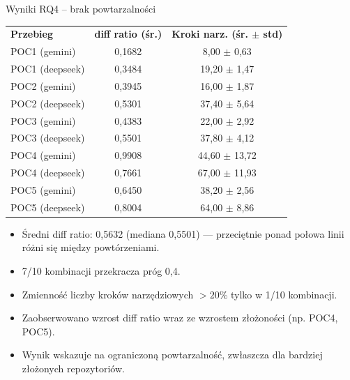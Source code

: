\documentclass[aspectratio=169]{beamer}
\begin{document}
\begin{frame}{Wyniki RQ4 -- brak powtarzalności}
    \small
    \begin{center}
        \begin{tabular}{lcc}
            \textbf{Przebieg} & \textbf{diff ratio (śr.)} & \textbf{Kroki narz. (śr. $\pm$ std)} \\
            POC1 (gemini) & 0,1682 & 8,00 $\pm$ 0,63 \\
            POC1 (deepseek) & 0,3484 & 19,20 $\pm$ 1,47 \\
            POC2 (gemini) & 0,3945 & 16,00 $\pm$ 1,87 \\
            POC2 (deepseek) & 0,5301 & 37,40 $\pm$ 5,64 \\
            POC3 (gemini) & 0,4383 & 22,00 $\pm$ 2,92 \\
            POC3 (deepseek) & 0,5501 & 37,80 $\pm$ 4,12 \\
            POC4 (gemini) & 0,9908 & 44,60 $\pm$ 13,72 \\
            POC4 (deepseek) & 0,7661 & 67,00 $\pm$ 11,93 \\
            POC5 (gemini) & 0,6450 & 38,20 $\pm$ 2,56 \\
            POC5 (deepseek) & 0,8004 & 64,00 $\pm$ 8,86 \\
        \end{tabular}
    \end{center}
    \begin{itemize}
        \item Średni diff ratio: 0,5632 (mediana 0,5501) — przeciętnie ponad połowa linii różni się między powtórzeniami.
        \item 7/10 kombinacji przekracza próg 0,4.
        \item Zmienność liczby kroków narzędziowych $>20\%$ tylko w 1/10 kombinacji.
        \item Zaobserwowano wzrost diff ratio wraz ze wzrostem złożoności (np. POC4, POC5).
        \item Wynik wskazuje na ograniczoną powtarzalność, zwłaszcza dla bardziej złożonych repozytoriów.
    \end{itemize}
\end{frame}
\end{document}
